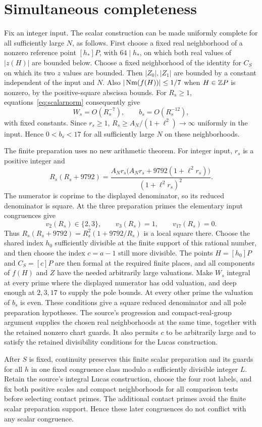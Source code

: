 \documentclass[11pt,a4paper]{article}
\begin{document}
\section{Simultaneous completeness}
Fix an integer input. The scalar construction can be made uniformly
complete for all sufficiently large $N$, as follows. First choose a fixed
real neighborhood of a nonzero reference point $[h_*]P$, with
$64\mid h_*$, on which both real values of $|z(H)|$ are bounded below.
Choose a fixed neighborhood of the identity for $C_S$ on which its two
$z$ values are bounded. Then $|Z_0|,|Z_1|$ are bounded by a constant
independent of the input and $N$. Also $|\operatorname{Nm}(f(H))|\le1/7$ when
$H\in\mathbb Z P$ is nonzero, by the positive-square abscissa bounds.
For $R_s\ge1$, equations~\eqref{eq:scalarnorm} consequently give
\[
                 W_s=O(R_s^{-7}),\qquad b_s=O(R_s^{-12}),
\]
with fixed constants. Since $r_s\ge1$,
$R_s\ge A_N/(1+\ell^2)\to\infty$ uniformly in the input.
Hence $0<b_s<17$ for all sufficiently large $N$ on these neighborhoods.

The finite preparation uses no new arithmetic theorem. For integer
input, $r_s$ is a positive integer and
\[
 R_s(R_s+9792)=
 \frac{A_Nr_s\bigl(A_Nr_s+9792(1+\ell^2r_s)\bigr)}
                    {(1+\ell^2r_s)^2}.
\]
The numerator is coprime to the displayed denominator, so its reduced
denominator is square. At the three preparation primes the elementary
input congruences give
\[
 v_2(R_s)\in\{2,3\},\qquad v_3(R_s)=1,
                       \qquad v_{17}(R_s)=0.
\]
Thus $R_s(R_s+9792)=R_s^2(1+9792/R_s)$ is a local square there.
Choose the shared index $h_0$ sufficiently divisible at the finite
support of this rational number, and then choose the index
$c=a-1$ still more divisible. The points $H=[h_0]P$ and $C_S=[c]P$
are then formal at the required finite places, and all components of
$f(H)$ and $Z$ have the needed arbitrarily large valuations. Make
$W_s$ integral at every prime where the displayed numerator has odd
valuation, and deep enough at $2,3,17$ to supply the pole bounds.
At every other prime the valuation of $b_s$ is even. These conditions
give a square reduced denominator and all pole preparation hypotheses.
The source's progression and compact-real-group argument supplies the
chosen real neighborhoods at the same time, together with the retained
nonzero chart guards. It also permits $c$ to be arbitrarily large and
to satisfy the retained divisibility conditions for the Lucas construction.

After $S$ is fixed, continuity preserves this finite scalar preparation
and its guards for all $h$ in one fixed congruence class modulo a
sufficiently divisible integer $L$. Retain the source's integral Lucas
construction, choose the four root labels, and fix both positive scales
and compact neighborhoods for all comparison tests before selecting
contact primes. The additional contact primes avoid the finite scalar
preparation support. Hence these later congruences do not conflict with
any scalar congruence.
\end{document}
